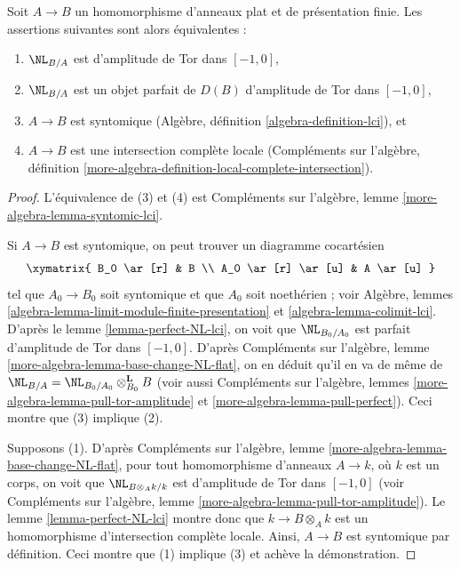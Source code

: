 \begin{lemma}
\label{lemma-flat-fp-NL-lci}
Soit $A \to B$ un homomorphisme d'anneaux plat et de présentation finie.
Les assertions suivantes sont alors équivalentes :
\begin{enumerate}
\item $\NL_{B/A}$ est d'amplitude de Tor dans $[-1, 0]$,
\item $\NL_{B/A}$ est un objet parfait de $D(B)$
d'amplitude de Tor dans $[-1, 0]$,
\item $A \to B$ est syntomique
(Algèbre, définition \ref{algebra-definition-lci}), et
\item $A \to B$ est une intersection complète locale
(Compléments sur l'algèbre, définition
\ref{more-algebra-definition-local-complete-intersection}).
\end{enumerate}
\end{lemma}

\begin{proof}
L'équivalence de (3) et (4) est Compléments sur l'algèbre, lemme
\ref{more-algebra-lemma-syntomic-lci}.

\medskip\noindent
Si $A \to B$ est syntomique, on peut trouver un diagramme cocartésien
$$
\xymatrix{
B_0 \ar[r] & B \\
A_0 \ar[r] \ar[u] & A \ar[u]
}
$$
tel que $A_0 \to B_0$ soit syntomique et que $A_0$ soit noethérien ; voir
Algèbre, lemmes \ref{algebra-lemma-limit-module-finite-presentation} et
\ref{algebra-lemma-colimit-lci}. D'après le lemme \ref{lemma-perfect-NL-lci},
on voit que $\NL_{B_0/A_0}$ est parfait d'amplitude de Tor dans $[-1, 0]$.
D'après Compléments sur l'algèbre, lemme \ref{more-algebra-lemma-base-change-NL-flat},
on en déduit qu'il en va de même de
$\NL_{B/A} = \NL_{B_0/A_0} \otimes_{B_0}^\mathbf{L} B$ (voir
aussi Compléments sur l'algèbre, lemmes \ref{more-algebra-lemma-pull-tor-amplitude} et
\ref{more-algebra-lemma-pull-perfect}).
Ceci montre que (3) implique (2).

\medskip\noindent
Supposons (1). D'après Compléments sur l'algèbre, lemme
\ref{more-algebra-lemma-base-change-NL-flat},
pour tout homomorphisme d'anneaux $A \to k$, où
$k$ est un corps, on voit que $\NL_{B \otimes_A k/k}$ est
d'amplitude de Tor dans $[-1, 0]$ (voir
Compléments sur l'algèbre, lemme \ref{more-algebra-lemma-pull-tor-amplitude}).
Le lemme \ref{lemma-perfect-NL-lci} montre donc que $k \to B \otimes_A k$ est
un homomorphisme d'intersection complète locale. Ainsi, $A \to B$
est syntomique par définition. Ceci montre que (1) implique (3)
et achève la démonstration.
\end{proof}


